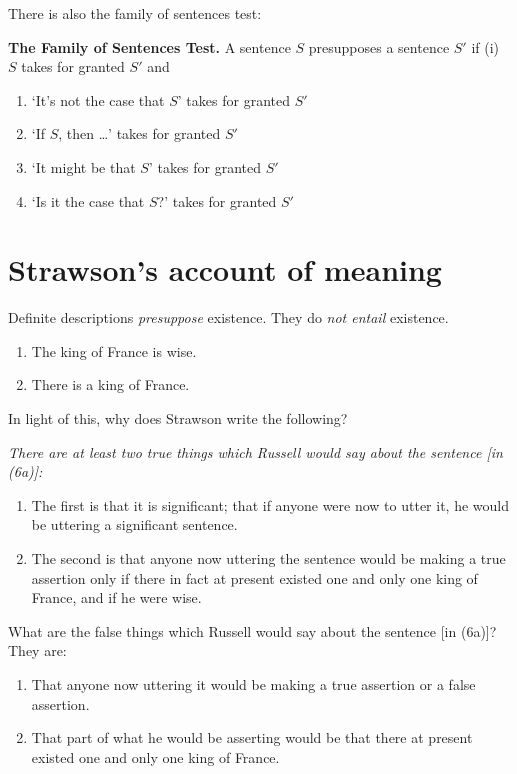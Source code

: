 There is also the family of sentences test:

\begin{slide}
\textbf{The Family of Sentences Test.} A sentence $S$ presupposes a sentence $S'$ if (i) $S$ takes for granted $S'$ and
\begin{enumerate}[label=(\roman*),start=2]
  \item `It's not the case that $S$' takes for granted $S'$
  \item `If $S$, then \ldots' takes for granted $S'$
  \item `It might be that $S$' takes for granted $S'$
  \item `Is it the case that $S$?' takes for granted $S'$
\end{enumerate}
\end{slide}

\section{Strawson's account of meaning}

Definite descriptions \emph{presuppose} existence. They do \emph{not entail} existence.

\begin{example}\leavevmode
\begin{enumerate}[label=(6\alph*)]
  \item The king of France is wise.
  \item There is a king of France.
\end{enumerate}
\end{example}

In light of this, why does Strawson write the following?

\begin{slide}
\itshape
There are at least two true things which Russell would say about the sentence [in (6a)]:
\begin{enumerate}[label=(\arabic*)]
  \item The first is that it is significant; that if anyone were now to utter it, he would be uttering a significant sentence.
  \item The second is that anyone now uttering the sentence would be making a true assertion only if there in fact at present existed one and only one king of France, and if he were wise.
\end{enumerate}
What are the false things which Russell would say about the sentence [in (6a)]? They are:
\begin{enumerate}[label=(\arabic*)]
  \item That anyone now uttering it would be making a true assertion or a false assertion.
  \item That part of what he would be asserting would be that there at present existed one and only one king of France.
\end{enumerate}
\end{slide}

